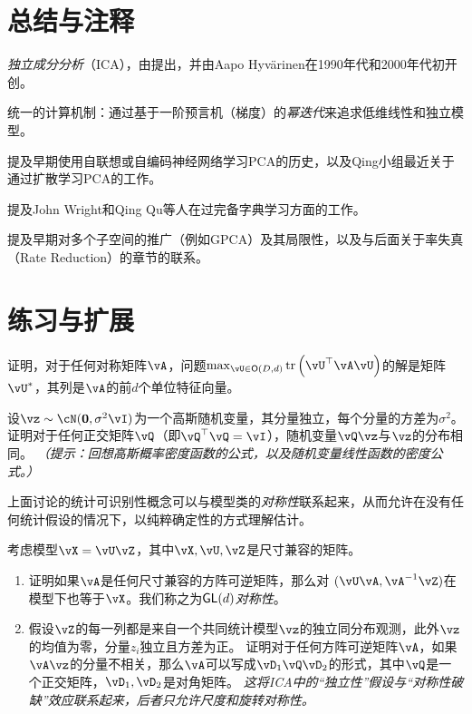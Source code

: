 \documentclass[../../book-main_zh.tex]{subfiles}
\begin{document}
\section{总结与注释}



\textit{独立成分分析}（ICA），由\cite{Ans-1985}提出，并由Aapo Hyv\"{a}rinen在1990年代和2000年代初开创。

统一的计算机制：通过基于一阶预言机（梯度）的\textit{幂迭代}来追求低维线性和独立模型。

提及早期使用自联想或自编码神经网络学习PCA的历史，以及Qing小组最近关于通过扩散学习PCA的工作。

提及John Wright和Qing Qu等人在过完备字典学习方面的工作。

提及早期对多个子空间的推广（例如GPCA）及其局限性，以及与后面关于率失真（Rate Reduction）的章节的联系。


\section{练习与扩展}


\begin{exercise}\label{exercise:principal-components-derivation}
    证明，对于任何对称矩阵\(\vA\)，问题\(\max_{\vU \in \O(D, d)}\tr\left(\vU^{\top}\vA\vU\right)\)的解是矩阵\(\vU^{\ast}\)，其列是\(\vA\)的前\(d\)个单位特征向量。
\end{exercise}

\begin{exercise}\label{exercise:gaussian-rot-invar}
    设$\vz \sim \cN(\Zero, \sigma^2 \vI)$为一个高斯随机变量，其分量独立，每个分量的方差为$\sigma^2$。
    证明对于任何正交矩阵$\vQ$（即$\vQ^\top \vQ = \vI$），随机变量$\vQ \vz$与$\vz$的分布相同。
    \textit{（提示：回想高斯概率密度函数的公式，以及随机变量线性函数的密度公式。）}
\end{exercise}

\begin{exercise}\label{exercise:symmetry-identifiability}
    上面讨论的统计可识别性概念可以与模型类的\textit{对称性}联系起来，从而允许在没有任何统计假设的情况下，以纯粹确定性的方式理解估计。

    考虑模型$\vX = \vU \vZ$，其中$\vX, \vU, \vZ$是尺寸兼容的矩阵。
    \begin{enumerate}
        \item 证明如果$\vA$是任何尺寸兼容的方阵可逆矩阵，那么对
        $(\vU \vA, \vA^{-1} \vZ)$在模型下也等于$\vX$。我们称之为\textit{$\mathsf{GL}(d)$对称性}。
        \item 假设$\vZ$的每一列都是来自一个共同统计模型$\vz$的独立同分布观测，此外$\vz$的均值为零，分量$z_i$独立且方差为正。
        证明对于任何方阵可逆矩阵$\vA$，如果$\vA \vz$的分量不相关，那么$\vA$可以写成$\vD_1 \vQ \vD_2$的形式，其中$\vQ$是一个正交矩阵，$\vD_1, \vD_2$是对角矩阵。
        \textit{这将ICA中的“独立性”假设与“对称性破缺”效应联系起来，后者只允许尺度和旋转对称性。}
    \end{enumerate}

\end{exercise}
\end{document}
